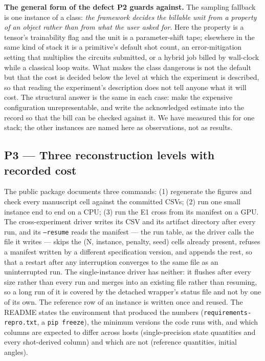 \documentclass[acmsmall,screen,review]{acmart}
\begin{document}
\textbf{The general form of the defect P2 guards against.} The sampling fallback is one instance of a class: \textit{the framework decides the billable unit from a property of an object rather than from what the user asked for}. Here the property is a tensor's trainability flag and the unit is a parameter-shift tape; elsewhere in the same kind of stack it is a primitive's default shot count, an error-mitigation setting that multiplies the circuits submitted, or a hybrid job billed by wall-clock while a classical loop waits. What makes the class dangerous is not the default but that the cost is decided below the level at which the experiment is described, so that reading the experiment's description does not tell anyone what it will cost. The structural answer is the same in each case: make the expensive configuration unrepresentable, and write the acknowledged estimate into the record so that the bill can be checked against it. We have measured this for one stack; the other instances are named here as observations, not as results.


\subsection{P3 --- Three reconstruction levels with recorded cost}

The public package documents three commands: (1) regenerate the figures and check every manuscript cell against the committed CSVs; (2) run one small instance end to end on a CPU; (3) run the E1 cross from its manifest on a GPU. The cross-experiment driver writes its CSV and its artifact directory after every run, and its \texttt{--resume} reads the manifest --- the run table, as the driver calls the file it writes --- skips the (N, instance, penalty, seed) cells already present, refuses a manifest written by a different specification version, and appends the rest, so that a restart after any interruption converges to the same file as an uninterrupted run. The single-instance driver has neither: it flushes after every size rather than every run and merges into an existing file rather than resuming, so a long run of it is covered by the detached wrapper's status file and not by one of its own. The reference row of an instance is written once and reused. The README states the environment that produced the numbers (\texttt{requirements-\allowbreak{}repro.\allowbreak{}txt}, a \texttt{pip freeze}), the minimum versions the code runs with, and which columns are expected to differ across hosts (single-precision state quantities and every shot-derived column) and which are not (reference quantities, initial angles).
\end{document}
